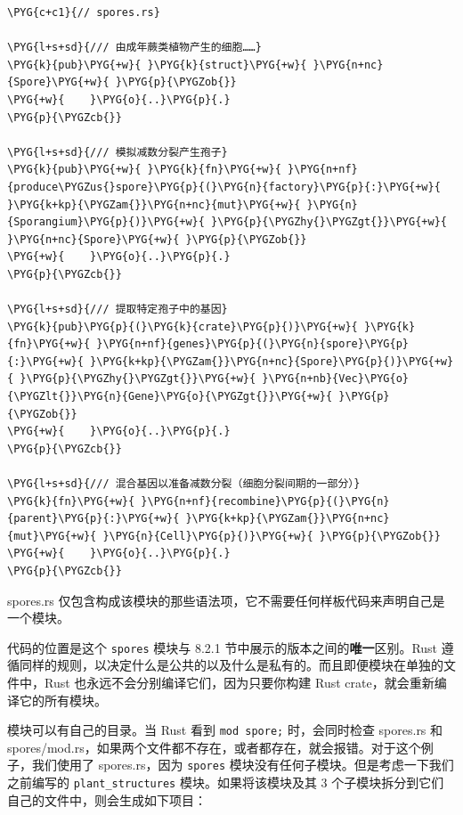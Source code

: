 \begin{Verbatim}[commandchars=\\\{\},breaklines=true,breakanywhere=true,fontsize=\codefont,xleftmargin=17bp]
\PYG{c+c1}{// spores.rs}

\PYG{l+s+sd}{/// 由成年蕨类植物产生的细胞……}
\PYG{k}{pub}\PYG{+w}{ }\PYG{k}{struct}\PYG{+w}{ }\PYG{n+nc}{Spore}\PYG{+w}{ }\PYG{p}{\PYGZob{}}
\PYG{+w}{    }\PYG{o}{..}\PYG{p}{.}
\PYG{p}{\PYGZcb{}}

\PYG{l+s+sd}{/// 模拟减数分裂产生孢子}
\PYG{k}{pub}\PYG{+w}{ }\PYG{k}{fn}\PYG{+w}{ }\PYG{n+nf}{produce\PYGZus{}spore}\PYG{p}{(}\PYG{n}{factory}\PYG{p}{:}\PYG{+w}{ }\PYG{k+kp}{\PYGZam{}}\PYG{n+nc}{mut}\PYG{+w}{ }\PYG{n}{Sporangium}\PYG{p}{)}\PYG{+w}{ }\PYG{p}{\PYGZhy{}\PYGZgt{}}\PYG{+w}{ }\PYG{n+nc}{Spore}\PYG{+w}{ }\PYG{p}{\PYGZob{}}
\PYG{+w}{    }\PYG{o}{..}\PYG{p}{.}
\PYG{p}{\PYGZcb{}}

\PYG{l+s+sd}{/// 提取特定孢子中的基因}
\PYG{k}{pub}\PYG{p}{(}\PYG{k}{crate}\PYG{p}{)}\PYG{+w}{ }\PYG{k}{fn}\PYG{+w}{ }\PYG{n+nf}{genes}\PYG{p}{(}\PYG{n}{spore}\PYG{p}{:}\PYG{+w}{ }\PYG{k+kp}{\PYGZam{}}\PYG{n+nc}{Spore}\PYG{p}{)}\PYG{+w}{ }\PYG{p}{\PYGZhy{}\PYGZgt{}}\PYG{+w}{ }\PYG{n+nb}{Vec}\PYG{o}{\PYGZlt{}}\PYG{n}{Gene}\PYG{o}{\PYGZgt{}}\PYG{+w}{ }\PYG{p}{\PYGZob{}}
\PYG{+w}{    }\PYG{o}{..}\PYG{p}{.}
\PYG{p}{\PYGZcb{}}

\PYG{l+s+sd}{/// 混合基因以准备减数分裂（细胞分裂间期的一部分）}
\PYG{k}{fn}\PYG{+w}{ }\PYG{n+nf}{recombine}\PYG{p}{(}\PYG{n}{parent}\PYG{p}{:}\PYG{+w}{ }\PYG{k+kp}{\PYGZam{}}\PYG{n+nc}{mut}\PYG{+w}{ }\PYG{n}{Cell}\PYG{p}{)}\PYG{+w}{ }\PYG{p}{\PYGZob{}}
\PYG{+w}{    }\PYG{o}{..}\PYG{p}{.}
\PYG{p}{\PYGZcb{}}
\end{Verbatim}

spores.rs 仅包含构成该模块的那些语法项，它不需要任何样板代码来声明自己是一个模块。

代码的位置是这个 \texttt{spores} 模块与 8.2.1 节中展示的版本之间的\textbf{唯一}区别。Rust 遵循同样的规则，以决定什么是公共的以及什么是私有的。而且即便模块在单独的文件中，Rust 也永远不会分别编译它们，因为只要你构建 Rust crate，就会重新编译它的所有模块。

模块可以有自己的目录。当 Rust 看到 \texttt{mod spore;} 时，会同时检查 spores.rs 和 spores/\allowbreak{}mod.rs，如果两个文件都不存在，或者都存在，就会报错。对于这个例子，我们使用了 spores.rs，因为 \texttt{spores} 模块没有任何子模块。但是考虑一下我们之前编写的 \texttt{plant\_structures} 模块。如果将该模块及其 3 个子模块拆分到它们自己的文件中，则会生成如下项目：

